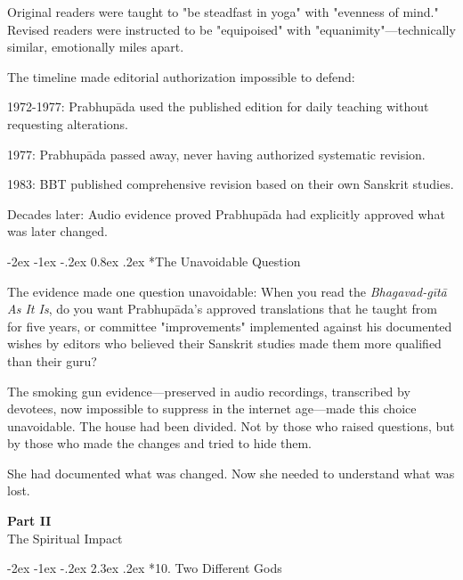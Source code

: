\documentclass[12pt,twoside]{book}
\makeatletter
\renewcommand\section{\@startsection{section}{1}{\z@}%
{-3.5ex \@plus -1ex \@minus -.2ex}%
{2.3ex \@plus.2ex}%
{\normalfont\Large\bfseries}}
\let\oldsection\section
\renewcommand{\section}[1]{\needspace{4\baselineskip}\oldsection{#1}}
\let\oldsubsection\subsection
\renewcommand{\subsection}[1]{\needspace{3\baselineskip}\oldsubsection{#1}}
\def\cleardoublepage{\clearpage\if@twoside \ifodd\c@page\else\hbox{}\thispagestyle{empty}\newpage\if@twocolumn\hbox{}\newpage\fi\fi\fi}
\renewcommand\section{\@startsection{section}{1}{\z@}%
{-2ex \@plus -1ex \@minus -.2ex}%
{2.3ex \@plus.2ex}%
{\normalfont\Large\bfseries}}
\renewcommand\subsection{\@startsection{subsection}{2}{\z@}%
{-2ex \@plus -1ex \@minus -.2ex}%
{0.8ex \@plus .2ex}%
{\normalfont\large\bfseries}}
\makeatother
\begin{document}
Original readers were taught to "be steadfast in yoga" with "evenness of mind." Revised readers were instructed to be "equipoised" with "equanimity"—technically similar, emotionally miles apart.

The timeline made editorial authorization impossible to defend:

1972-1977: Prabhupāda used the published edition for daily teaching without requesting alterations.

1977: Prabhupāda passed away, never having authorized systematic revision.

1983: BBT published comprehensive revision based on their own Sanskrit studies.

Decades later: Audio evidence proved Prabhupāda had explicitly approved what was later changed.

\vspace{0.1cm}
\subsection*{The Unavoidable Question}

The evidence made one question unavoidable: When you read the \emph{Bhagavad-gītā As It Is}, do you want Prabhupāda's approved translations that he taught from for five years, or committee "improvements" implemented against his documented wishes by editors who believed their Sanskrit studies made them more qualified than their guru?

The smoking gun evidence—preserved in audio recordings, transcribed by devotees, now impossible to suppress in the internet age—made this choice unavoidable. The house had been divided. Not by those who raised questions, but by those who made the changes and tried to hide them.

She had documented what was changed. Now she needed to understand what was lost.

\cleardoublepage  %
\pagestyle{empty}
\vspace*{0.20\textheight}
\begin{center}
{\Huge\bfseries Part II}\\[0.5cm]
{\Large The Spiritual Impact}
\end{center}
\vspace*{\fill}
\cleardoublepage
\pagestyle{fancy}
\vspace*{0.20\textheight}
\section*{10. Two Different Gods}
\thispagestyle{chapterpage}
\end{document}
